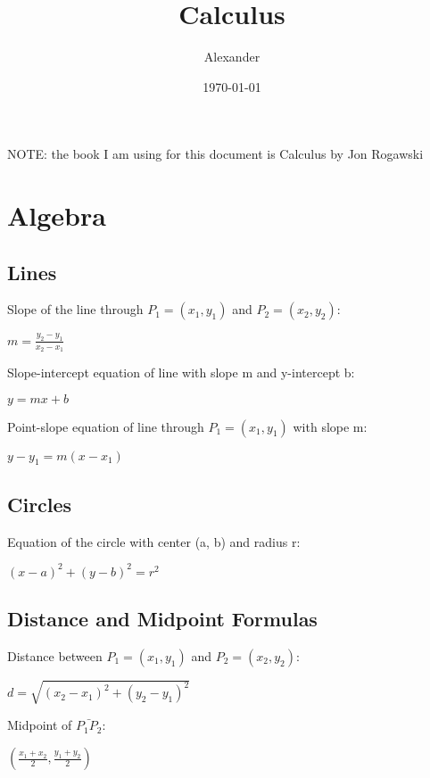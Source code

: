 \documentclass{article}
\title{Calculus}
\author{Alexander}
\date{\today}
\begin{document}
\maketitle

NOTE: the book I am using for this document is Calculus by Jon Rogawski

\section* {Algebra}
	\subsection*{Lines}
		Slope of the line through $P_1 = (x_1, y_1)$ and $P_2 = (x_2, y_2)$:
			\begin{center}
			$m = \frac{y_2 - y_1}{x_2 - x_1}$
			\end{center}
		Slope-intercept equation of line with slope m and y-intercept b:
			\begin{center}
			$y = mx + b$
			\end{center}
		Point-slope equation of line through $P_1 = (x_1, y_1)$ with slope m:
			\begin{center}
			$y - y_1 = m(x - x_1)$
			\end{center}
	\subsection*{Circles}
		Equation of the circle with center (a, b) and radius r:
			\begin{center}
			$(x - a)^2 + (y - b)^2 = r^2$
			\end{center}
	\subsection*{Distance and Midpoint Formulas}
		Distance between $P_1 = (x_1, y_1)$ and $P_2 = (x_2, y_2)$:
			\begin{center}
			$d = \sqrt{(x_2 - x_1)^2 + (y_2 - y_1)^2}$
			\end{center}
		Midpoint of $\bar{P_1P_2}$:
			\begin{center}
			$(\frac{x_1 + x_2}{2}, \frac{y_1 + y_2}{2})$
			\end{center}
\end{document}

